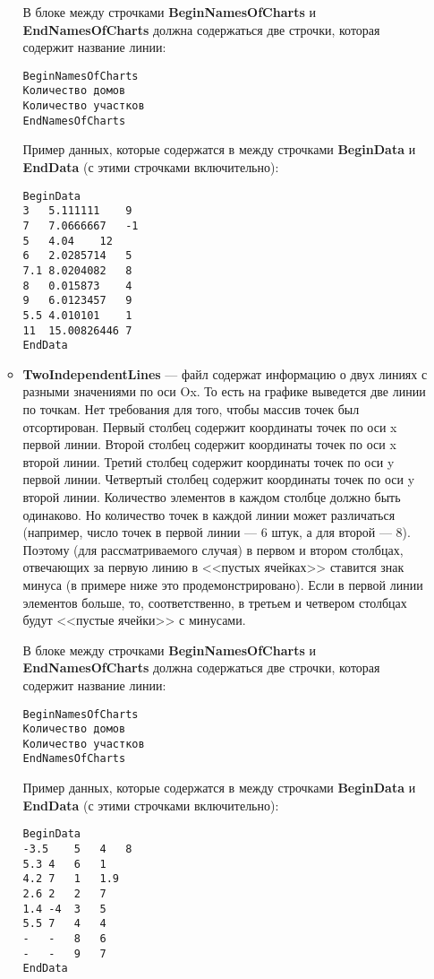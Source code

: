 \documentclass[a4paper,12pt]{article}
\begin{document}
\begin{itemize}
\begin{itemize}
В блоке между строчками \textbf{BeginNamesOfCharts} и \textbf{EndNamesOfCharts} должна содержаться две строчки, которая содержит название линии:
\begin{lstlisting}[label=Line03_4,caption=Для TwoLines ]
BeginNamesOfCharts
Количество домов
Количество участков
EndNamesOfCharts
\end{lstlisting}

Пример данных, которые содержатся в между строчками \textbf{BeginData} и \textbf{EndData} (с этими строчками включительно):
\begin{lstlisting}[label=Line03_5,caption=Для TwoLines ]
BeginData
3	5.111111	9
7	7.0666667	-1
5	4.04	12
6	2.0285714	5
7.1	8.0204082	8
8	0.015873	4
9	6.0123457	9
5.5	4.010101	1
11	15.00826446	7
EndData
\end{lstlisting}

\item \textbf{TwoIndependentLines} --- файл содержат информацию о двух линиях с разными значениями по оси Ox. То есть на графике выведется две линии по точкам. Нет требования для того, чтобы массив точек был отсортирован. Первый столбец содержит координаты точек по оси x первой линии. Второй столбец содержит координаты точек по оси x второй линии. Третий столбец содержит координаты точек по оси y первой линии. Четвертый столбец содержит координаты точек по оси y второй линии. Количество элементов в каждом столбце должно быть одинаково. Но количество точек в каждой линии может различаться (например, число точек в первой линии --- 6 штук, а для второй --- 8). Поэтому (для рассматриваемого случая) в первом и втором столбцах, отвечающих за первую линию в <<пустых ячейках>> ставится знак минуса (в примере ниже это продемонстрировано). Если в первой линии элементов больше, то, соответственно, в третьем и четвером столбцах будут  <<пустые ячейки>> с минусами.

В блоке между строчками \textbf{BeginNamesOfCharts} и \textbf{EndNamesOfCharts} должна содержаться две строчки, которая содержит название линии:
\begin{lstlisting}[label=Line03_6,caption=Для TwoIndependentLines ]
BeginNamesOfCharts
Количество домов
Количество участков
EndNamesOfCharts
\end{lstlisting}

Пример данных, которые содержатся в между строчками \textbf{BeginData} и \textbf{EndData} (с этими строчками включительно):
\begin{lstlisting}[label=Line03_7,caption=Для TwoIndependentLines ]
BeginData
-3.5	5	4	8
5.3	4	6	1
4.2	7	1	1.9
2.6	2	2	7
1.4	-4	3	5
5.5	7	4	4
-	-	8	6
-	-	9	7
EndData
\end{lstlisting}


\end{itemize}
\end{itemize}
\end{document}
